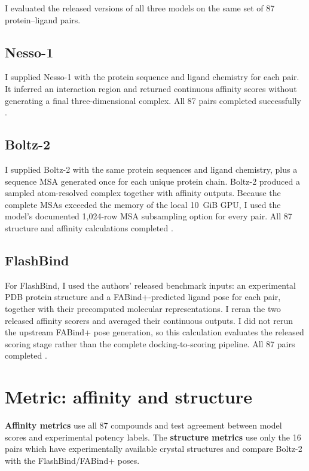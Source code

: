 \documentclass[11pt]{article}
\begin{document}
I evaluated the released versions of all three models on the same set
of 87 protein--ligand pairs.

\subsection{Nesso-1}

I supplied Nesso-1 with the protein sequence and ligand chemistry for each
pair. It inferred an interaction region and returned continuous affinity
scores without generating a final three-dimensional complex. All 87 pairs
completed successfully \citep{shenoy2026nesso1}.

\subsection{Boltz-2}

I supplied Boltz-2 with the same protein sequences and ligand chemistry, plus
a sequence MSA generated once for each unique protein chain. Boltz-2 produced
a sampled atom-resolved complex together with affinity outputs. Because the
complete MSAs exceeded the memory of the local 10~GiB GPU, I used the model's
documented 1,024-row MSA subsampling option for every pair. All 87 structure
and affinity calculations completed \citep{passaro2025boltz2}.

\subsection{FlashBind}

For FlashBind, I used the authors' released benchmark inputs: an experimental
PDB protein structure and a FABind+-predicted ligand pose for each pair,
together with their precomputed molecular representations. I reran the two
released affinity scorers and averaged their continuous outputs. I did not
rerun the upstream FABind+ pose generation, so this calculation evaluates the
released scoring stage rather than the complete docking-to-scoring pipeline.
All 87 pairs completed \citep{jiang2026flashbind}.

\section{Metric: affinity and structure}


\textbf{Affinity metrics} use all 87 compounds and test agreement between model
scores and experimental potency labels. The \textbf{structure metrics} use
only the 16 pairs which have experimentally available crystal structures and compare Boltz-2 with
the FlashBind/FABind+ poses.
\end{document}
